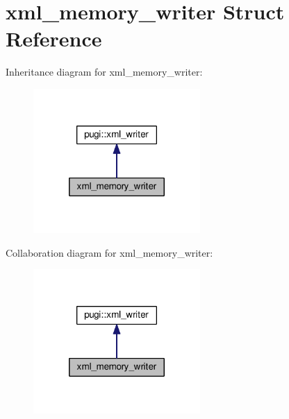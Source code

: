 \hypertarget{structxml__memory__writer}{\section{xml\+\_\+memory\+\_\+writer Struct Reference}
\label{structxml__memory__writer}
}


Inheritance diagram for xml\+\_\+memory\+\_\+writer\+:
\nopagebreak
\begin{figure}[H]
\begin{center}
\leavevmode
\includegraphics[width=180pt]{structxml__memory__writer__inherit__graph}
\end{center}
\end{figure}


Collaboration diagram for xml\+\_\+memory\+\_\+writer\+:
\nopagebreak
\begin{figure}[H]
\begin{center}
\leavevmode
\includegraphics[width=180pt]{structxml__memory__writer__coll__graph}
\end{center}
\end{figure}
